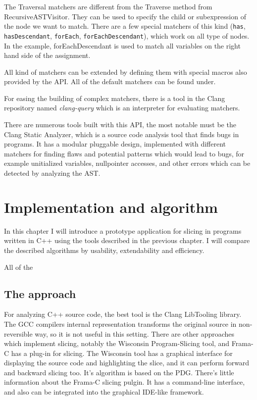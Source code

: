 \documentclass[oneside,12pt,a4paper]{book}
\begin{document}
The Traversal matchers are different from the Traverse method from RecursiveASTVisitor. They can be used to specify the child or subexpression of the node we want to match. There are a few special matchers of this kind (\texttt{has}, \texttt{hasDescendant}, \texttt{forEach}, \texttt{forEachDescendant}), which work on all type of nodes. In the example, forEachDescendant is used to match all variables on the right hand side of the assignment. 

All kind of matchers can be extended by defining them with special macros also provided by the API. All of the default matchers can be found under\cite{ASTMatchers-reference}.

For easing the building of complex matchers, there is a tool in the Clang repository named \textit{clang-query} which is an interpreter for evaluating matchers.

There are numerous tools built with this API, the most notable must be the Clang Static Analyzer\cite{clang-static-analyzer}, which is a source code analysis tool that finds bugs in programs. It has a modular pluggable design, implemented with different matchers for finding flaws and potential patterns which would lead to bugs, for example unitialized variables, nullpointer accesses, and other errors which can be detected by analyzing the AST.

\chapter{Implementation and algorithm}

In this chapter I will introduce a prototype application for slicing in programs written in C++ using the tools described in the previous chapter. I will compare the described algorithms by usability, extendability and efficiency. 

All of the %

\section{The approach}

For analyzing C++ source code, the best tool is the Clang LibTooling library. The GCC compilers internal representation transforms the original source in non-reversible way, so it is not useful in this setting. There are other approaches which implement slicing, notably the Wisconsin Program-Slicing tool\cite{Wisconsin-slicing-tool}, and Frama-C has a plug-in for slicing\cite{Frama-C-slicing}. The Wisconsin tool has a graphical interface for displaying the source code and highlighting the slice, and it can perform forward and backward slicing too. It's algorithm is based on the PDG. There's little information about the Frama-C slicing pulgin. It has a command-line interface, and also can be integrated into the graphical IDE-like framework.
\end{document}
